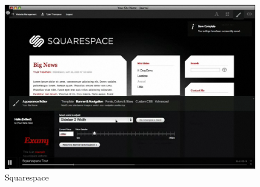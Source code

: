 \begin{figure}[!ht]
\centering
\includegraphics[width=.70\textwidth]{img/squarespace.png}
\caption{Squarespace}
\label{figure:squarespace}
\end{figure}